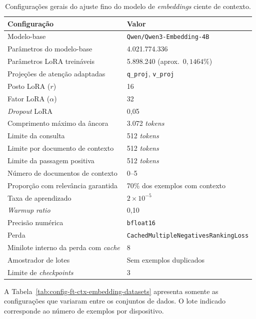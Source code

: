 \begin{table}[htbp]
\caption{Configurações gerais do ajuste fino do modelo de \textit{embeddings} ciente de contexto.}
\label{tab:config-ft-ctx-embedding}
\centering
\footnotesize
\begin{tabular}{ll}
\hline
\textbf{Configuração} & \textbf{Valor} \\ \hline
Modelo-base & \texttt{Qwen/Qwen3-Embedding-4B} \\
Parâmetros do modelo-base & 4.021.774.336 \\
Parâmetros LoRA treináveis & 5.898.240 (aprox.\ $0{,}1464\%$) \\
Projeções de atenção adaptadas & \texttt{q\_proj}, \texttt{v\_proj} \\
Posto LoRA ($r$) & 16 \\
Fator LoRA ($\alpha$) & 32 \\
\textit{Dropout} LoRA & 0,05 \\
Comprimento máximo da âncora & 3.072 \textit{tokens} \\
Limite da consulta & 512 \textit{tokens} \\
Limite por documento de contexto & 512 \textit{tokens} \\
Limite da passagem positiva & 512 \textit{tokens} \\
Número de documentos de contexto & 0--5 \\
Proporção com relevância garantida & 70\% dos exemplos com contexto \\
Taxa de aprendizado & $2\times10^{-5}$ \\
\textit{Warmup ratio} & 0,10 \\
Precisão numérica & \texttt{bfloat16} \\
Perda & \texttt{CachedMultipleNegativesRankingLoss} \\
Minilote interno da perda com \textit{cache} & 8 \\
Amostrador de lotes & Sem exemplos duplicados \\
Limite de \textit{checkpoints} & 3 \\ \hline
\end{tabular}
\end{table}

A Tabela~\ref{tab:config-ft-ctx-embedding-datasets} apresenta somente as configurações que variaram entre os conjuntos de dados. O lote indicado corresponde ao número de exemplos por dispositivo.

